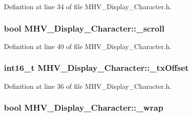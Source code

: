 \-Definition at line 34 of file \-M\-H\-V\-\_\-\-Display\-\_\-\-Character.\-h.

\hypertarget{class_m_h_v___display___character_aa208e08f734702c3ca2805a974501eb0}{
\subsubsection[{\-\_\-scroll}]{\setlength{\rightskip}{0pt plus 5cm}bool {\bf \-M\-H\-V\-\_\-\-Display\-\_\-\-Character\-::\-\_\-scroll}}}
\label{class_m_h_v___display___character_aa208e08f734702c3ca2805a974501eb0}


\-Definition at line 40 of file \-M\-H\-V\-\_\-\-Display\-\_\-\-Character.\-h.

\hypertarget{class_m_h_v___display___character_a997a8b28ee03d28dffdb05837fcb2020}{
\subsubsection[{\-\_\-tx\-Offset}]{\setlength{\rightskip}{0pt plus 5cm}int16\-\_\-t {\bf \-M\-H\-V\-\_\-\-Display\-\_\-\-Character\-::\-\_\-tx\-Offset}}}
\label{class_m_h_v___display___character_a997a8b28ee03d28dffdb05837fcb2020}


\-Definition at line 36 of file \-M\-H\-V\-\_\-\-Display\-\_\-\-Character.\-h.

\hypertarget{class_m_h_v___display___character_aad907c23ad7592642d5bb30aa26bf251}{
\subsubsection[{\-\_\-wrap}]{\setlength{\rightskip}{0pt plus 5cm}bool {\bf \-M\-H\-V\-\_\-\-Display\-\_\-\-Character\-::\-\_\-wrap}}}
\label{class_m_h_v___display___character_aad907c23ad7592642d5bb30aa26bf251}


